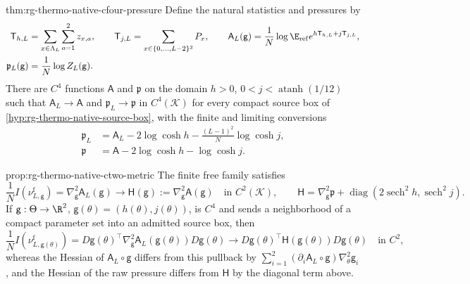 {thm:rg-thermo-native-cfour-pressure}
Define the natural statistics and pressures by
\begin{align}
 \mathsf T_{h,L}&=\sum_{x\in\Lambda_L}\sum_{a=1}^2z_{x,a},\qquad
 \mathsf T_{j,L}=\sum_{x\in\{0,\ldots,L-2\}^2}P_x,\qquad
 \mathsf A_L(\mathsf g)=\frac1N\log\E_{\mathrm{ref}}
                          e^{h\mathsf T_{h,L}+j\mathsf T_{j,L}},
 \label{eq:rg-thermo-native-natural-pressure}\\
 \mathfrak p_L(\mathsf g)&=\frac1N\log Z_L(\mathsf g).
 \label{eq:rg-thermo-label-natural-pressure}
\end{align}
There are $C^4$ functions $\mathsf A$ and $\mathfrak p$ on the domain $h>0$,
$0<j<\operatorname{atanh}(1/12)$ such that $\mathsf A_L\to\mathsf A$ and
$\mathfrak p_L\to\mathfrak p$ in $C^4(\mathcal K)$ for every compact source
box of \cref{hyp:rg-thermo-native-source-box}, with the finite and limiting
conversions
\begin{equation}
 \begin{split}
 \mathfrak p_L&=\mathsf A_L-2\log\cosh h-\frac{(L-1)^2}{N}\log\cosh j,\\
 \mathfrak p&=\mathsf A-2\log\cosh h-\log\cosh j.
 \end{split}
 \label{eq:rg-thermo-native-pressure-conversion}
\end{equation}

{prop:rg-thermo-native-ctwo-metric}
The finite free family satisfies
\begin{equation}
 \frac1N I(\nu^{\mathrm f}_{L,\mathsf g})=\nabla_{\mathsf g}^2\mathsf A_L(\mathsf g)
 \longrightarrow \mathsf H(\mathsf g):=\nabla_{\mathsf g}^2\mathsf A(\mathsf g)
 \quad\text{in }C^2(\mathcal K),
 \qquad
 \mathsf H=\nabla_{\mathsf g}^2\mathfrak p+
      \operatorname{diag}(2\operatorname{sech}^2h,
                              \operatorname{sech}^2j).
 \label{eq:rg-thermo-native-fisher-pressure}
\end{equation}
If $\mathsf g:\Theta\to\R^2$, $\mathsf g(\theta)=(h(\theta),j(\theta))$, is $C^4$ and
sends a neighborhood of a compact parameter set into an admitted source box,
then
\begin{equation}
 \frac1N I(\nu^{\mathrm f}_{L,\mathsf g(\theta)})
 =D\mathsf g(\theta)^\top\nabla_{\mathsf g}^2\mathsf A_L(\mathsf g(\theta))D\mathsf g(\theta)
 \longrightarrow
 D\mathsf g(\theta)^\top\mathsf H(\mathsf g(\theta))D\mathsf g(\theta)
 \quad\text{in }C^2,
 \label{eq:rg-thermo-native-source-pullback}
\end{equation}
whereas the Hessian of $\mathsf A_L\circ\mathsf g$ differs from this pullback by
$\sum_{i=1}^2(\partial_i\mathsf A_L\circ\mathsf g)\nabla^2_\theta\mathsf g_i$, and the
Hessian of the raw pressure differs from $\mathsf H$ by the diagonal term
above. 

